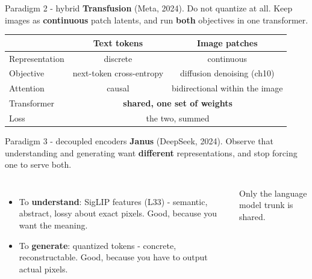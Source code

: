 \documentclass[aspectratio=169]{beamer}
\begin{document}
\begin{frame}{Paradigm 2 - hybrid}
  \small
  \textbf{Transfusion} (Meta, 2024). Do not quantize at all. Keep images as
  \textbf{continuous} patch latents, and run \textbf{both} objectives in one transformer.
  \vskip 8pt
  \begin{center}
    \footnotesize
    \begin{tabular}{lcc}
      \toprule
      & \textbf{Text tokens} & \textbf{Image patches} \\
      \midrule
      Representation & discrete & continuous \\
      Objective & next-token cross-entropy & diffusion denoising (ch10) \\
      Attention & causal & bidirectional within the image \\
      \midrule
      Transformer & \multicolumn{2}{c}{\textbf{shared, one set of weights}} \\
      Loss & \multicolumn{2}{c}{the two, summed} \\
      \bottomrule
    \end{tabular}
  \end{center}
  \vskip 8pt
\end{frame}

\begin{frame}{Paradigm 3 - decoupled encoders}
  \small
  \textbf{Janus} (DeepSeek, 2024). Observe that understanding and generating want
  \textbf{different} representations, and stop forcing one to serve both.
  \vskip 8pt
  \begin{columns}[T]
    \footnotesize
    \begin{itemize}\itemsep 3pt
      \item To \textbf{understand}: SigLIP features (L33) - semantic, abstract, lossy about
        exact pixels. Good, because you want the meaning.
      \item To \textbf{generate}: quantized tokens - concrete, reconstructable. Good,
        because you have to output actual pixels.
    \end{itemize}
    \vskip 5pt
    Only the language model trunk is shared.
  \end{columns}
\end{frame}
\end{document}
